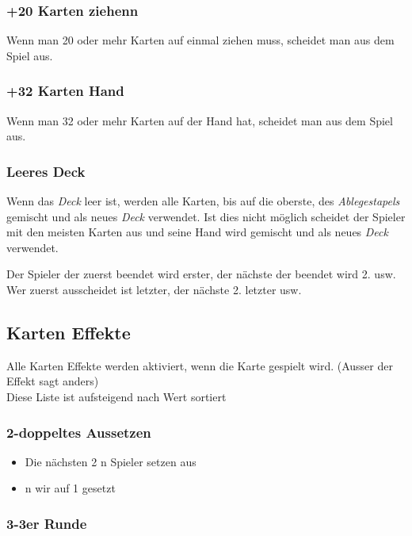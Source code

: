 \documentclass[10pt,a4paper]{article}
\begin{document}
\subsubsection{+20 Karten ziehenn}\label{karten-ziehenn}

Wenn man 20 oder mehr Karten auf einmal ziehen muss, scheidet man aus
dem Spiel aus.

\subsubsection{+32 Karten Hand}\label{karten-hand}

Wenn man 32 oder mehr Karten auf der Hand hat, scheidet man aus dem
Spiel aus.

\subsubsection{Leeres Deck}\label{leeres-deck}

Wenn das \emph{Deck} leer ist, werden alle Karten, bis auf die oberste,
des \emph{Ablegestapels} gemischt und als neues \emph{Deck} verwendet.
Ist dies nicht möglich scheidet der Spieler mit den meisten Karten aus
und seine Hand wird gemischt und als neues \emph{Deck} verwendet.

Der Spieler der zuerst beendet wird erster, der nächste der beendet wird
2. usw. Wer zuerst ausscheidet ist letzter, der nächste 2. letzter usw.

\subsection{Karten Effekte}\label{karten-effekte}

Alle Karten Effekte werden aktiviert, wenn die Karte gespielt wird.
(Ausser der Effekt sagt anders)\\
Diese Liste ist aufsteigend nach Wert sortiert

\subsubsection{2-doppeltes Aussetzen}\label{doppeltes-aussetzen}

\begin{itemize}
\item
  Die nächsten 2 n Spieler setzen aus
\item
  n wir auf 1 gesetzt
\end{itemize}

\subsubsection{3-3er Runde}\label{er-runde}
\end{document}
